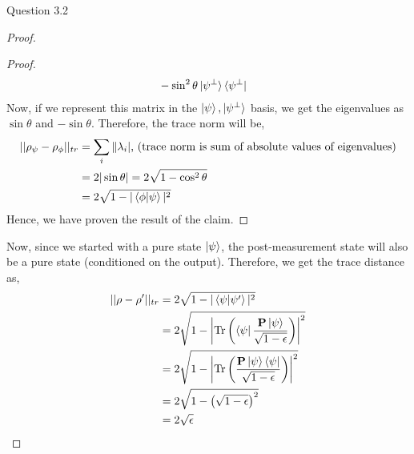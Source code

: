 \begin{solution}{Question 3.2}
\begin{proof}
\begin{proof}
\begin{equation}
\begin{split}
                    &-\sin^2\theta\ket{\psi^\perp}\bra{\psi^\perp}
                \end{split}
            \end{equation}
            Now, if we represent this matrix in the $\ket{\psi}, \ket{\psi^\perp}$ basis, we get the eigenvalues as $\sin\theta$ and $-\sin\theta$. Therefore, the trace norm will be,
            \begin{equation}
                \begin{split}
                    ||\rho_{\psi} - \rho_{\phi}||_{tr} &= \sum_i\|\lambda_i|\text{, (trace norm is sum of absolute values of eigenvalues)}\\
                    &= 2|\sin\theta| = 2\sqrt{1 - \cos^2\theta}\\
                    &= 2\sqrt{1 - |\braket{\phi|\psi}|^2}
                \end{split}
            \end{equation}
            Hence, we have proven the result of the claim.
        \end{proof}
        Now, since we started with a pure state $\ket{\psi}$, the post-measurement state will also be a pure state (conditioned on the output). Therefore, we get the trace distance as,
        \begin{equation}
            \begin{split}
                ||\rho - \rho'||_{tr} &= 2\sqrt{1 - |\braket{\psi|\psi'}|^2}\\
                &= 2\sqrt{1 - \left|\mathrm{Tr}\left( \bra{\psi}\frac{\mathbf{P}\ket{\psi}}{\sqrt{1-\epsilon}} \right)\right|^2}\\
                &= 2\sqrt{1 - \left|\mathrm{Tr}\left( \frac{\mathbf{P}\ket{\psi}\bra{\psi}}{\sqrt{1-\epsilon}} \right)\right|^2}\\
                &= 2\sqrt{1 - \left(\sqrt{1 - \epsilon}\right)^2}\\
                &= 2\sqrt{\epsilon}
            \end{split}
        \end{equation}
    \end{proof}
\end{solution}
